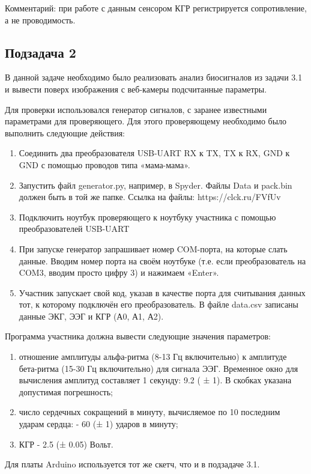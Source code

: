 Комментарий: при работе с данным сенсором КГР регистрируется сопротивление, а не проводимость.

\subsection*{Подзадача 2}

В данной задаче необходимо было реализовать анализ биосигналов из задачи 3.1 и вывести поверх изображения с веб-камеры подсчитанные параметры. 

Для проверки использовался генератор сигналов, с заранее известными параметрами для проверяющего. Для этого проверяющему необходимо было выполнить следующие действия:

\begin{enumerate}
\item Соединить два преобразователя USB-UART RX к TX, TX к RX, GND к GND с помощью проводов типа «мама-мама».
\item Запустить файл generator.py, например, в Spyder. Файлы Data и pack.bin должен быть в той же папке. Ссылка на файлы: https://clck.ru/FVfUv 
\item Подключить ноутбук проверяющего к ноутбуку участника с помощью преобразователей USB-UART
\item При запуске генератор запрашивает номер COM-порта, на которые слать данные. Вводим номер порта на своём ноутбуке (т.е. если преобразователь на COM3, вводим просто цифру 3) и нажимаем «Enter». 
\item Участник запускает свой код, указав в качестве порта для считывания данных тот, к которому подключён его преобразователь. В файле data.csv записаны данные ЭКГ, ЭЭГ и КГР (А0, А1, А2). 
\end{enumerate}

Программа участника должна вывести следующие значения параметров:
\begin{enumerate}
    \item отношение амплитуды альфа-ритма (8-13 Гц включительно) к амплитуде бета-ритма (15-30 Гц включительно) для сигнала ЭЭГ. Временное окно для вычисления амплитуд составляет 1 секунду: 9.2 ( ± 1). В скобках указана допустимая погрешность; 
    \item число сердечных сокращений в минуту, вычисляемое по 10 последним ударам сердца: - 60 (± 1) ударов в минуту;
    \item КГР - 2.5 (± 0.05) Вольт.
\end{enumerate}

Для платы Arduino используется тот же скетч, что и в подзадаче 3.1.

